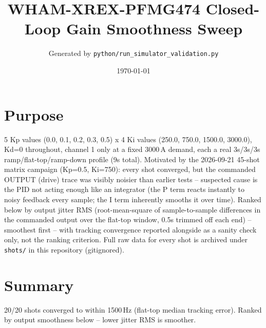 \documentclass[11pt]{article}
\title{WHAM-XREX-PFMG474 Closed-Loop Gain Smoothness Sweep}
\author{Generated by \texttt{python/run\_simulator\_validation.py}}
\date{\today}
\newcommand{\code}[1]{\texttt{#1}}
\begin{document}
\maketitle

\section*{Purpose}
5 Kp values (0.0, 0.1, 0.2, 0.3, 0.5) x 4 Ki values (250.0, 750.0, 1500.0, 3000.0), Kd=0 throughout, channel 1 only at a fixed 3000\,A demand, each a real 3s/3s/3s ramp/flat-top/ramp-down profile (9s total). Motivated by the 2026-09-21 45-shot matrix campaign (Kp=0.5, Ki=750): every shot converged, but the commanded OUTPUT (drive) trace was visibly noisier than earlier tests -- suspected cause is the PID not acting enough like an integrator (the P term reacts instantly to noisy feedback every sample; the I term inherently smooths it over time). Ranked below by output jitter RMS (root-mean-square of sample-to-sample differences in the commanded output over the flat-top window, 0.5s trimmed off each end) -- smoothest first -- with tracking convergence reported alongside as a sanity check only, not the ranking criterion. Full raw data for every shot is archived under \code{shots/} in this repository (gitignored).

\section*{Summary}
20/20 shots converged to within 1500\,Hz (flat-top median tracking error). Ranked by output smoothness below -- lower jitter RMS is smoother.
\end{document}
